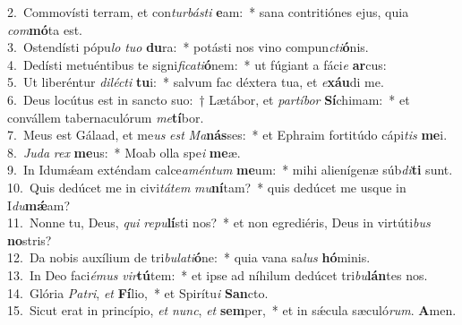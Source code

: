 {2.~}Commovísti terram, et con\textit{tur}\textit{bá}\textit{sti} \textbf{e}am:~* sana contritiónes ejus, quia \textit{com}\textbf{mó}ta est.\\
{3.~}Ostendísti pópu\textit{lo} \textit{tu}\textit{o} \textbf{du}ra:~* potásti nos vino compun\textit{cti}\textbf{ó}nis.\\
{4.~}Dedísti metuéntibus te signi\textit{fi}\textit{ca}\textit{ti}\textbf{ó}nem:~* ut fúgiant a fáci\textit{e} \textbf{ar}cus:\\
{5.~}Ut liberéntur \textit{di}\textit{lé}\textit{cti} \textbf{tu}i:~* salvum fac déxtera tua, et \textit{e}\textbf{xáu}di me.\\
{6.~}Deus locútus est in sancto suo:~† Lætábor, et \textit{par}\textit{tí}\textit{bor} \textbf{Sí}chimam:~* et convállem tabernaculórum \textit{me}\textbf{tí}bor.\\
{7.~}Meus est Gálaad, et me\textit{us} \textit{est} \textit{Ma}\textbf{nás}ses:~* et Ephraim fortitúdo cápi\textit{tis} \textbf{me}i.\\
{8.~}\textit{Ju}\textit{da} \textit{rex} \textbf{me}us:~* Moab olla spe\textit{i} \textbf{me}æ.\\
{9.~}In Idumǽam exténdam calce\textit{a}\textit{mén}\textit{tum} \textbf{me}um:~* mihi alienígenæ súb\textit{di}\textbf{ti} sunt.\\
{10.~}Quis dedúcet me in civi\textit{tá}\textit{tem} \textit{mu}\textbf{ní}tam?~* quis dedúcet me usque in I\textit{du}\textbf{mǽ}am?\\
{11.~}Nonne tu, Deus, \textit{qui} \textit{re}\textit{pu}\textbf{lí}sti nos?~* et non egrediéris, Deus in virtúti\textit{bus} \textbf{no}stris?\\
{12.~}Da nobis auxílium de tri\textit{bu}\textit{la}\textit{ti}\textbf{ó}ne:~* quia vana sa\textit{lus} \textbf{hó}minis.\\
{13.~}In Deo faci\textit{é}\textit{mus} \textit{vir}\textbf{tú}tem:~* et ipse ad níhilum dedúcet tri\textit{bu}\textbf{lán}tes nos.\\
{14.~}Glória \textit{Pa}\textit{tri}, \textit{et} \textbf{Fí}lio,~* et Spirítu\textit{i} \textbf{San}cto.\\
{15.~}Sicut erat in princípio, \textit{et} \textit{nunc}, \textit{et} \textbf{sem}per,~* et in sǽcula sæculó\textit{rum}. \textbf{A}men.\\
